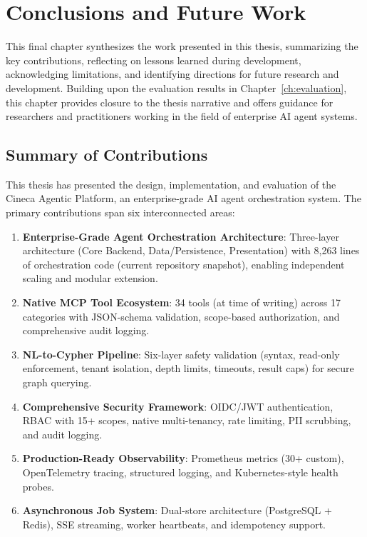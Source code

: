 \documentclass[a4paper,twoside]{sapthesis}
\newcommand{\ToolCount}{34}
\newcommand{\OrchestratorLOC}{8,263}
\begin{document}
\chapter{Conclusions and Future Work}
\label{ch:conclusions}

This final chapter synthesizes the work presented in this thesis, summarizing the key contributions, reflecting on lessons learned during development, acknowledging limitations, and identifying directions for future research and development. Building upon the evaluation results in Chapter~\ref{ch:evaluation}, this chapter provides closure to the thesis narrative and offers guidance for researchers and practitioners working in the field of enterprise AI agent systems.

\section{Summary of Contributions}
\label{sec:summary}

This thesis has presented the design, implementation, and evaluation of the Cineca Agentic Platform, an enterprise-grade AI agent orchestration system. The primary contributions span six interconnected areas:

\begin{enumerate}
    \item \textbf{Enterprise-Grade Agent Orchestration Architecture}: Three-layer architecture (Core Backend, Data/Persistence, Presentation) with \OrchestratorLOC{} lines of orchestration code (current repository snapshot), enabling independent scaling and modular extension.
    
    \item \textbf{Native MCP Tool Ecosystem}: \ToolCount{} tools (at time of writing) across 17 categories with JSON-schema validation, scope-based authorization, and comprehensive audit logging.
    
    \item \textbf{NL-to-Cypher Pipeline}: Six-layer safety validation (syntax, read-only enforcement, tenant isolation, depth limits, timeouts, result caps) for secure graph querying.
    
    \item \textbf{Comprehensive Security Framework}: OIDC/JWT authentication, RBAC with 15+ scopes, native multi-tenancy, rate limiting, PII scrubbing, and audit logging.
    
    \item \textbf{Production-Ready Observability}: Prometheus metrics (30+ custom), OpenTelemetry tracing, structured logging, and Kubernetes-style health probes.
    
    \item \textbf{Asynchronous Job System}: Dual-store architecture (PostgreSQL + Redis), SSE streaming, worker heartbeats, and idempotency support.
\end{enumerate}
\end{document}
